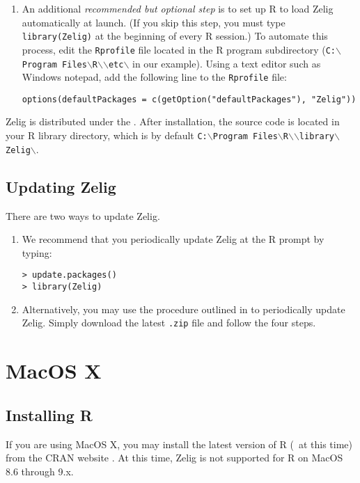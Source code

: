 \documentclass{article}
\begin{document}
\begin{enumerate}
\item An additional \emph{recommended but optional step} is to set up
  R to load Zelig automatically at launch.  (If you skip this step,
  you must type {\tt library(Zelig)} at the beginning of every R
  session.)  To automate this process, edit the {\tt Rprofile} file
  located in the R program subdirectory ({\tt C:$\backslash$Program
    Files$\backslash$R$\backslash$\rwvers$\backslash$etc$\backslash$}
  in our example).  Using a text editor such as Windows notepad, add
  the following line to the {\tt Rprofile} file:
\begin{verbatim}
options(defaultPackages = c(getOption("defaultPackages"), "Zelig"))
\end{verbatim}
\end{enumerate}

Zelig is distributed under the .  After
installation, the source code is located in your R library directory,
which is by default {\tt C:$\backslash$Program
  Files$\backslash$R$\backslash$\rwvers$\backslash$library$\backslash$Zelig$\backslash$}.

\subsection{Updating Zelig}

There are two ways to update Zelig.
\begin{enumerate}
\item We recommend that you periodically update Zelig at the R prompt
  by typing:
\begin{verbatim}
> update.packages()
> library(Zelig)
\end{verbatim}
\item Alternatively, you may use the procedure outlined in
   to periodically update Zelig.  Simply download the
  latest {\tt .zip} file and follow the four steps.
\end{enumerate}

\section{MacOS X}\label{ss:osx}

\subsection{Installing R}  

If you are using MacOS X, you may install the latest version of R
(\fullrvers\ at this time) from the CRAN website .
At this time, Zelig is not supported for R on MacOS 8.6 through 9.x.
\end{document}
